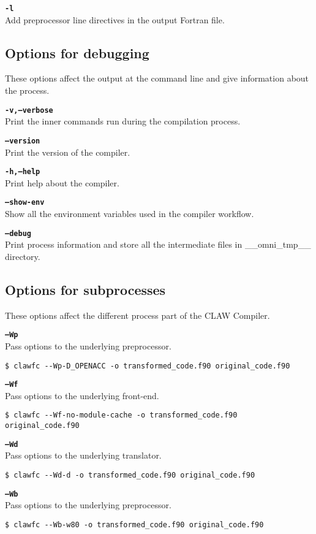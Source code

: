 \documentclass{article}
\begin{document}
\textbf{\texttt{-l}}\\
Add preprocessor line directives in the output Fortran file.

\subsection{Options for debugging}
These options affect the output at the command line and give information about the process.

\textbf{\texttt{-v,--verbose}}\\
Print the inner commands run during the compilation process.

\textbf{\texttt{--version}}\\
Print the version of the compiler.

\textbf{\texttt{-h,--help}}\\
Print help about the compiler.

\textbf{\texttt{--show-env}}\\
Show all the environment variables used in the compiler workflow.

\textbf{\texttt{--debug}}\\
Print process information and store all the intermediate files in \_\_omni\_tmp\_\_ directory.

\subsection{Options for subprocesses}
These options affect the different process part of the CLAW Compiler.

\textbf{\texttt{--Wp}}\\
Pass options to the underlying preprocessor.
\begin{lstlisting}
$ clawfc --Wp-D_OPENACC -o transformed_code.f90 original_code.f90
\end{lstlisting}

\textbf{\texttt{--Wf}}\\
Pass options to the underlying front-end.
\begin{lstlisting}
$ clawfc --Wf-no-module-cache -o transformed_code.f90 original_code.f90
\end{lstlisting}

\textbf{\texttt{--Wd}}\\
Pass options to the underlying translator.
\begin{lstlisting}
$ clawfc --Wd-d -o transformed_code.f90 original_code.f90
\end{lstlisting}

\textbf{\texttt{--Wb}}\\
Pass options to the underlying preprocessor.
\begin{lstlisting}
$ clawfc --Wb-w80 -o transformed_code.f90 original_code.f90
\end{lstlisting}
\end{document}
